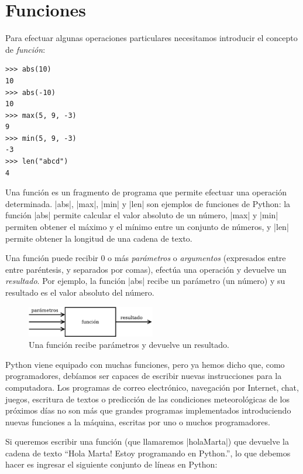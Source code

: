\section{Funciones}

Para efectuar algunas operaciones particulares necesitamos introducir el
concepto de {\it función}:

\begin{lstlisting}[numbers=none]
>>> abs(10)
10
>>> abs(-10)
10
>>> max(5, 9, -3)
9
>>> min(5, 9, -3)
-3
>>> len("abcd")
4
\end{lstlisting}

Una función es un fragmento de programa que permite efectuar una operación
determinada.  |abs|, |max|, |min| y |len| son ejemplos de funciones de Python:
la función |abs| permite calcular el valor absoluto de un número, |max| y |min|
permiten obtener el máximo y el mínimo entre un conjunto de números, y |len|
permite obtener la longitud de una cadena de texto.

Una función puede recibir 0 o más {\it parámetros} o {\it argumentos}
(expresados entre entre paréntesis, y separados por comas), efectúa una
operación y devuelve un {\it resultado}.  Por ejemplo, la función |abs| recibe
un parámetro (un número) y su resultado es el valor absoluto del número.

\begin{figure}[ht]
\caption{Una función recibe parámetros y devuelve un resultado.}
\begin{center}
\includegraphics[width=0.5\textwidth]{graficos/funcion}
\end{center}
\end{figure}

Python viene equipado con muchas funciones, pero ya hemos dicho que, como
programadores, debíamos ser capaces de escribir nuevas instrucciones para la
computadora. Los programas de correo electrónico, navegación por Internet,
chat, juegos, escritura de textos o predicción de las condiciones
meteorológicas de los próximos días no son más que grandes programas
implementados introduciendo nuevas funciones a la máquina, escritas por uno o
muchos programadores.

Si queremos escribir una función (que llamaremos |holaMarta|) que devuelve la
cadena de texto ``Hola Marta! Estoy programando en Python.'', lo que debemos
hacer es ingresar el siguiente conjunto de líneas en Python:


